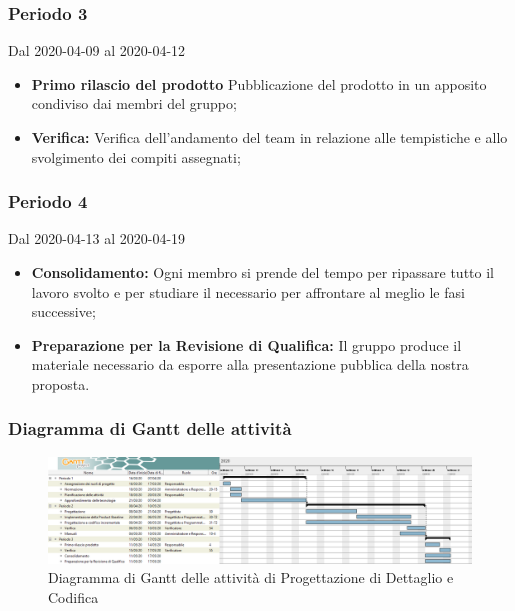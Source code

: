 \subsubsection{Periodo 3}
Dal 2020-04-09 al 2020-04-12\\
\begin{itemize}
	\item \textbf{Primo rilascio del prodotto} Pubblicazione del prodotto in un apposito  condiviso dai membri del gruppo;
	\item \textbf{Verifica:} Verifica dell'andamento del team in relazione alle tempistiche e allo svolgimento dei compiti assegnati;
\end{itemize}
\subsubsection{Periodo 4} 
Dal 2020-04-13 al 2020-04-19\\
\begin{itemize}
	\item \textbf{Consolidamento:} Ogni membro si prende del tempo per ripassare tutto il lavoro svolto e per studiare il necessario per affrontare al meglio le fasi successive;
	\item \textbf{Preparazione per la Revisione di Qualifica:} Il gruppo produce il materiale necessario da esporre alla presentazione pubblica della nostra proposta.
\end{itemize}

\newpage
\begin{landscape}
	\subsubsection{Diagramma di Gantt delle attività}
	\pagestyle{empty}
	\begin{figure}[h]
			
		\begin{center}	
				\includegraphics[scale=0.5]{Sezioni/DiagrammiGantt/ProgettazioneDiDettaglio.png}	
		\end{center}
	\caption{Diagramma di Gantt delle attività di Progettazione di Dettaglio e Codifica}	
	\end{figure}
\end{landscape}

